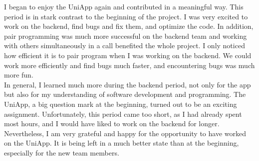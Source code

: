 \documentclass[sf-font,usefira,english]{uulm/sp/article}
\begin{document}
I began to enjoy the UniApp again and contributed in a meaningful way. 
This period is in stark contrast to the beginning of the project. 
I was very excited to work on the backend, find bugs and fix them, and optimize the code. 
In addition, pair programming was much more successful on the backend team and working with others simultaneously in a call benefited the whole project. 
I only noticed how efficient it is to pair program when I was working on the backend. 
We could work more efficiently and find bugs much faster, and encountering bugs was much more fun.\\

In general, I learned much more during the backend period, not only for the app but also for my understanding of software development and programming. 
The UniApp, a big question mark at the beginning, turned out to be an exciting assignment. 
Unfortunately, this period came too short, as I had already spent most hours, and I would have liked to work on the backend for longer.\\

Nevertheless, I am very grateful and happy for the opportunity to have worked on the UniApp. 
It is being left in a much better state than at the beginning, especially for the new team members.
\end{document}
